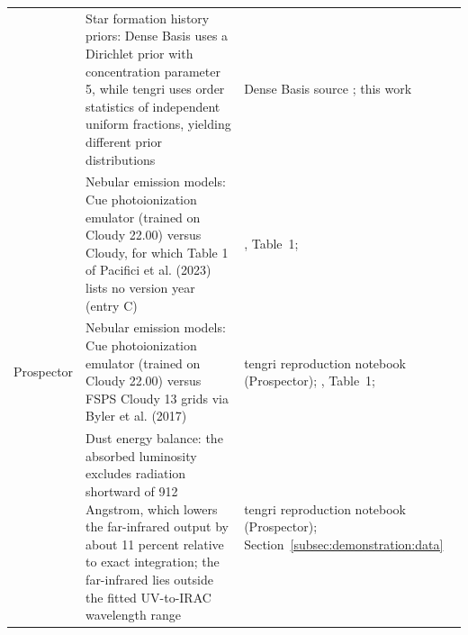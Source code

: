 \begin{table}[!t]
\begin{tabular}{@{}lll@{}}
 & \parbox[t]{9.6cm}{\raggedright Star formation history priors: Dense Basis uses a Dirichlet prior with concentration parameter 5, while tengri uses order statistics of independent uniform fractions, yielding different prior distributions} & \parbox[t]{4.6cm}{\raggedright Dense Basis source \citep{Iyer_2019}; this work} \\
 & \parbox[t]{9.6cm}{\raggedright Nebular emission models: Cue photoionization emulator (trained on Cloudy 22.00) versus Cloudy, for which Table 1 of Pacifici et al. (2023) lists no version year (entry C)} & \parbox[t]{4.6cm}{\raggedright \citet{Pacifici_2023}, Table~1; \citet{Li_2025}} \\
\midrule
Prospector & \parbox[t]{9.6cm}{\raggedright Nebular emission models: Cue photoionization emulator (trained on Cloudy 22.00) versus FSPS Cloudy 13 grids via Byler et al. (2017)} & \parbox[t]{4.6cm}{\raggedright tengri reproduction notebook (Prospector); \citet{Pacifici_2023}, Table~1; \citet{Li_2025}} \\
 & \parbox[t]{9.6cm}{\raggedright Dust energy balance: the absorbed luminosity excludes radiation shortward of 912 Angstrom, which lowers the far-infrared output by about 11 percent relative to exact integration; the far-infrared lies outside the fitted UV-to-IRAC wavelength range} & \parbox[t]{4.6cm}{\raggedright tengri reproduction notebook (Prospector); Section~\ref{subsec:demonstration:data}} \\
\bottomrule
\end{tabular}
\end{table}
